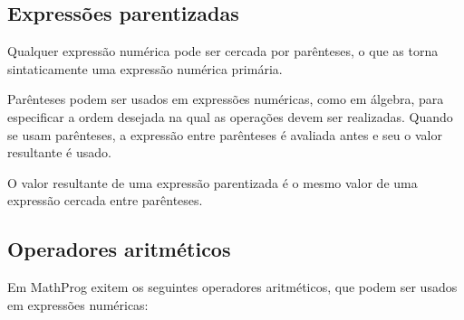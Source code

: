 \documentclass[11pt, brazil]{report}
\begin{document}

\newpage

\subsection{Expressões parentizadas}

Qualquer expressão numérica pode ser cercada por parênteses, o que as
torna sintaticamente uma expressão numérica primária.

Parênteses podem ser usados em expressões numéricas, como em álgebra, para
especificar a ordem desejada na qual as operações devem ser realizadas.
Quando se usam parênteses, a expressão entre parênteses é avaliada
antes e seu o valor resultante é usado.

O valor resultante de uma expressão parentizada é o mesmo
valor de uma expressão cercada entre parênteses.

%
%

\subsection{Operadores aritméticos}

Em MathProg exitem os seguintes operadores aritméticos, que podem ser
usados em expressões numéricas:

\end{document}
